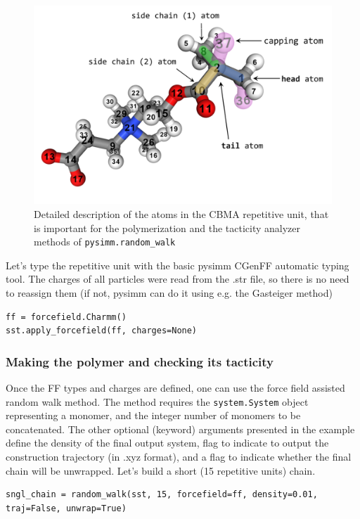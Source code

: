 \documentclass[9pt,tutorial]{livecoms}
\begin{document}
\begin{figure}[htbp]
  \centering
    \includegraphics[width=0.9\columnwidth]{figures/figure2_mod}
    \caption{Detailed description of the atoms in the CBMA repetitive unit, that is important for the polymerization and the tacticity analyzer methods of \lstinline$pysimm.random_walk$}
    \label{rep-unit}
\end{figure}

Let's type the repetitive unit with the basic pysimm CGenFF automatic typing tool. The charges of all particles were read from the .str file, so there is no need to reassign them (if not, pysimm can do it using e.g. the Gasteiger method)

\begin{lstlisting}
ff = forcefield.Charmm()
sst.apply_forcefield(ff, charges=None)
\end{lstlisting}


\subsubsection{Making the polymer and checking its tacticity}

Once the FF types and charges are defined, one can use the force field assisted random walk method. The method requires the \lstinline$system.System$ object representing a monomer, and the integer number of monomers to be concatenated.  The other optional (keyword) arguments presented in the example define the density of the final output system, flag to indicate to output the construction trajectory (in .xyz format), and a flag to indicate whether the final chain will be unwrapped. Let's build a short (15 repetitive units) chain.

\begin{lstlisting}
sngl_chain = random_walk(sst, 15, forcefield=ff, density=0.01, traj=False, unwrap=True)
\end{lstlisting}
\end{document}
